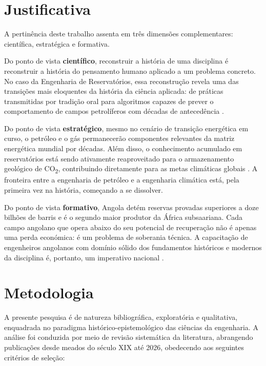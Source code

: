 \documentclass[
  12pt,
  a4paper,
  oneside,
  brazilian,
  sumario=tradicional
]{abntex2}
\begin{document}
\section{Justificativa}

A pertinência deste trabalho assenta em três dimensões complementares:
científica, estratégica e formativa.

Do ponto de vista \textbf{científico}, reconstruir a história de uma
disciplina é reconstruir a história do pensamento humano aplicado a um
problema concreto. No caso da Engenharia de Reservatórios, essa
reconstrução revela uma das transições mais eloquentes da história da
ciência aplicada: de práticas transmitidas por tradição oral para
algoritmos capazes de prever o comportamento de campos petrolíferos
com décadas de antecedência \cite{dake2014, rosa2006}.

Do ponto de vista \textbf{estratégico}, mesmo no cenário de transição
energética em curso, o petróleo e o gás permanecerão componentes
relevantes da matriz energética mundial por décadas. Além disso, o
conhecimento acumulado em reservatórios está sendo ativamente
reaproveitado para o armazenamento geológico de CO\textsubscript{2},
contribuindo diretamente para as metas climáticas globais
\cite{bachu2000}. A fronteira entre a engenharia de petróleo e a
engenharia climática está, pela primeira vez na história, começando
a se dissolver.

Do ponto de vista \textbf{formativo}, Angola detém reservas provadas
superiores a doze bilhões de barris e é o segundo maior produtor da
África subsaariana. Cada campo angolano que opera abaixo do seu
potencial de recuperação não é apenas uma perda económica: é um
problema de soberania técnica. A capacitação de engenheiros angolanos
com domínio sólido dos fundamentos históricos e modernos da disciplina
é, portanto, um imperativo nacional \cite{ramos2016, ramos2020}.

\section{Metodologia}

A presente pesquisa é de natureza bibliográfica, exploratória e
qualitativa, enquadrada no paradigma histórico-epistemológico das
ciências da engenharia. A análise foi conduzida por meio de revisão
sistemática da literatura, abrangendo publicações desde meados do
século XIX até 2026, obedecendo aos seguintes critérios de seleção:
\end{document}

